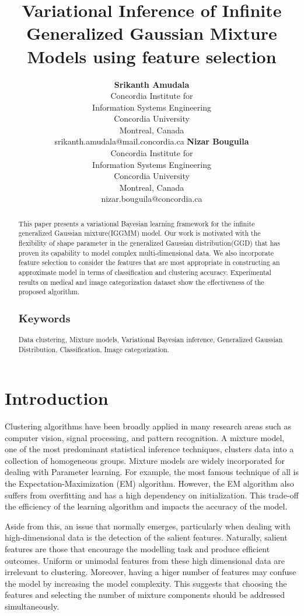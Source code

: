 \documentclass[letterpaper]{article}
\title{Variational Inference of Infinite Generalized Gaussian Mixture Models using feature selection}
\author{} %
\author{ {\bf Srikanth Amudala} \\
Concordia Institute for \\Information Systems Engineering \\
Concordia University\\
Montreal, Canada\\srikanth.amudala@mail.concordia.ca 
\And
{\bf Nizar Bouguila}  \\
Concordia Institute for \\Information Systems Engineering \\
Concordia University\\
Montreal, Canada\\nizar.bouguila@concordia.ca
}
\begin{document}
\maketitle

\begin{abstract}
This paper presents a variational Bayesian learning
framework for the infinite generalized Gaussian mixture(IGGMM)
model. Our work is motivated with the flexibility of shape parameter in the generalized Gaussian distribution(GGD) that has proven its capability to model complex multi-dimensional
data. We also incorporate feature selection to consider the features that are most appropriate in constructing an approximate model in terms of classification and clustering accuracy. 
Experimental results on medical and image categorization dataset show the effectiveness of the proposed algorithm.
\subsection*{\textbf{Keywords}}
Data clustering, Mixture models, Variational Bayesian inference,
Generalized Gaussian Distribution, Classification, Image categorization.
\end{abstract}

\section{Introduction}
Clustering algorithms have been broadly applied in many research areas such as computer vision, signal processing, and pattern recognition. 
A mixture model, one of the most predominant statistical inference techniques,  clusters data into a collection of homogeneous groups.
Mixture models are widely incorporated for dealing with Parameter learning. 
For example, 
the most famous technique\cite{bouguila2006unsupervised} of all is the Expectation-Maximization (EM) algorithm. However, the EM algorithm also suffers from overfitting and has a high dependency on initialization\cite{stauffer1999adaptive}. 
This trade-off the efficiency of the learning algorithm and impacts the accuracy of the model.

Aside from this, an issue that normally emerges, particularly when dealing with high-dimensional 
data is the detection of the salient features. Naturally, salient features are those that encourage 
the modelling task and produce efficient outcomes. 
Uniform or unimodal features from these high dimensional data are irrelevant to clustering. Moreover, having a higer number of features may confuse the model by increasing the model complexity\cite{harrison1998organizational}\cite{law2004simultaneous}. 
This suggests that choosing the features and selecting the number of mixture components should be
addressed simultaneously.
\end{document}
